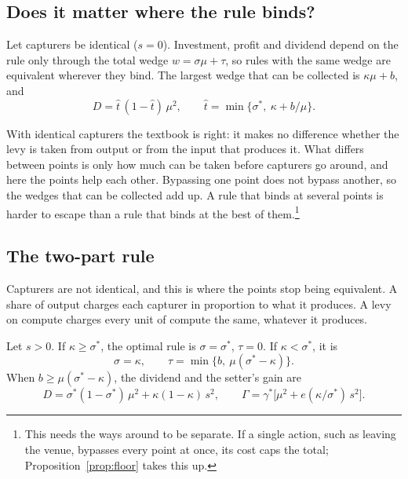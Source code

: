 \subsection{Does it matter where the rule binds?}

\begin{proposition}[Invariance]\label{prop:inv}
Let capturers be identical ($s=0$). Investment, profit and dividend depend on the rule
only through the total wedge $w=\sigma\mu+\tau$, so rules with the same wedge are
equivalent wherever they bind. The largest wedge that can be collected is
$\kappa\mu+b$, and
\begin{equation}
  D=\hat t\,(1-\hat t)\,\mu^2, \qquad \hat t=\min\bigl\{\sigma^*,\ \kappa+b/\mu\bigr\}.
\end{equation}
\end{proposition}

With identical capturers the textbook is right: it makes no difference whether the levy
is taken from output or from the input that produces it. What differs between points is
only how much can be taken before capturers go around, and here the points help each
other. Bypassing one point does not bypass another, so the wedges that can be collected
add up. A rule that binds at several points is harder to escape than a rule that binds at
the best of them.\footnote{This needs the ways around to be separate. If a single
action, such as leaving the venue, bypasses every point at once, its cost caps the total;
Proposition~\ref{prop:floor} takes this up.}

\subsection{The two-part rule}

Capturers are not identical, and this is where the points stop being equivalent. A share
of output charges each capturer in proportion to what it produces. A levy on compute
charges every unit of compute the same, whatever it produces.

\begin{proposition}\label{prop:two}
Let $s>0$. If $\kappa\ge\sigma^*$, the optimal rule is $\sigma=\sigma^*$, $\tau=0$. If
$\kappa<\sigma^*$, it is
\begin{equation}\label{eq:two}
  \sigma=\kappa, \qquad \tau=\min\bigl\{b,\ \mu(\sigma^*-\kappa)\bigr\}.
\end{equation}
When $b\ge\mu(\sigma^*-\kappa)$, the dividend and the setter's gain are
\begin{equation}\label{eq:split}
  D=\sigma^*(1-\sigma^*)\,\mu^2+\kappa(1-\kappa)\,s^2, \qquad
  \Gamma=\gamma^*\bigl[\mu^2+e(\kappa/\sigma^*)\,s^2\bigr].
\end{equation}
\end{proposition}

